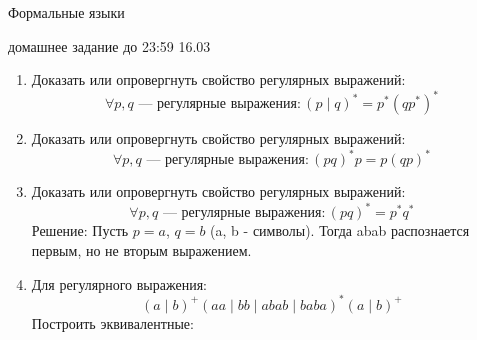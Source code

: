 \documentclass[12pt]{article}
\newenvironment{myauto}[1][3]
{
  \begin{center}
    \begin{tikzpicture}[> = stealth,node distance=#1cm, on grid, very thick]
}
{
    \end{tikzpicture}
  \end{center}
}
\begin{document}
\begin{center} {\LARGE Формальные языки} \end{center}

\begin{center} \Large домашнее задание до 23:59 16.03 \end{center}
\bigskip

\begin{enumerate}
  \item Доказать или опровергнуть свойство регулярных выражений:
  \[
    \forall p, q \text{ --- регулярные выражения}: (p \mid q)^* = p^*(qp^*)^*
  \]
  \item Доказать или опровергнуть свойство регулярных выражений:
  \[
    \forall p, q \text{ --- регулярные выражения}: (p q)^* p = p (q p)^*
  \]
  \begin{comment}
  Решение: Представленный ниже автомат подходит для обоих выражений.
  \begin{myauto}
    \node[state,initial]   (q_0) {$q_0$};
     \node[state, accepting] (q_1) [right=of q_0] {$q_1$};

    \path[->] (q_0) edge [bend left]             node [above] {$p$}    (q_1)
    		  (q_1) edge [bend left]             node [below] {$q$} (q_0)

              
    ;
  \end{myauto}
  \end{comment}
  \item Доказать или опровергнуть свойство регулярных выражений:
  \[
    \forall p, q \text{ --- регулярные выражения}: (p q)^* = p^* q^*
  \]
  Решение:
  Пусть $p=a$, $q=b$ (a, b - символы). Тогда abab распознается первым, но не вторым выражением. 
  \item Для регулярного выражения:
   \[ (a \mid b)^+ (aa \mid bb \mid abab \mid baba)^* (a \mid b)^+\]
  Построить эквивалентные:
\end{enumerate}
\end{document}
